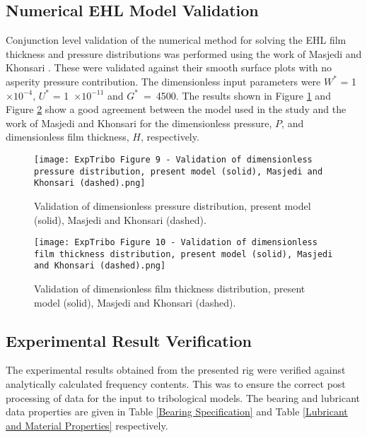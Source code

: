 \subsection{Numerical EHL Model Validation}
Conjunction level validation of the numerical method for solving the EHL film thickness and pressure distributions was performed using the work of Masjedi and Khonsari \cite{Masjedi2012}. These were validated against their smooth surface plots with no asperity pressure contribution. The dimensionless input parameters were $W^*$ = 1~$\times 10^{-4}$, $U^*$ = 1~$\times 10^{-11}$ and $G^*$~=~4500. The results shown in Figure \ref{EHL Pressure Validation Masjedi Khonsari} and Figure \ref{EHL Film Validation Masjedi Khonsari} show a good agreement between the model used in the study and the work of Masjedi and Khonsari for the dimensionless pressure, $P$, and dimensionless film thickness, $H$, respectively.

\begin{figure}
	\centering
	\texttt{[image: ExpTribo Figure 9 - Validation of dimensionless pressure distribution, present model (solid), Masjedi and Khonsari (dashed).png]}
	\caption{Validation of dimensionless pressure distribution, present model (solid), Masjedi and Khonsari (dashed).}
	\label{EHL Pressure Validation Masjedi Khonsari}
\end{figure}

\begin{figure}
	\centering
	\texttt{[image: ExpTribo Figure 10 - Validation of dimensionless film thickness distribution, present model (solid), Masjedi and Khonsari (dashed).png]}
	\caption{Validation of dimensionless film thickness distribution, present model (solid), Masjedi and Khonsari (dashed).}
	\label{EHL Film Validation Masjedi Khonsari}
\end{figure}

\subsection{Experimental Result Verification}
The experimental results obtained from the presented rig were verified against analytically calculated frequency contents. This was to ensure the correct post processing of data for the input to tribological models. The bearing and lubricant data properties are given in Table \ref{Bearing Specification} and Table \ref{Lubricant and Material Properties} respectively.

